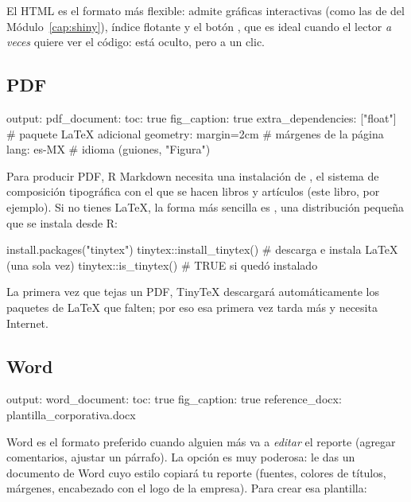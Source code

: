 El HTML es el formato más flexible: admite gráficas interactivas (como las
de  del Módulo~\ref{cap:shiny}), índice flotante y el botón
, que es ideal cuando el lector \emph{a veces} quiere
ver el código: está oculto, pero a un clic.

\subsection{PDF}

\begin{textocodigo}
output:
  pdf_document:
    toc: true
    fig_caption: true
    extra_dependencies: ["float"]   # paquete LaTeX adicional
geometry: margin=2cm                # márgenes de la página
lang: es-MX                         # idioma (guiones, "Figura")
\end{textocodigo}

Para producir PDF, R Markdown necesita una instalación de
, el sistema de composición tipográfica con el que se hacen
libros y artículos (este libro, por ejemplo). Si no tienes LaTeX, la forma
más sencilla es , una distribución pequeña que se instala
desde R:

\begin{rnoejecutar}
install.packages("tinytex")
tinytex::install_tinytex()   # descarga e instala LaTeX (una sola vez)
tinytex::is_tinytex()        # TRUE si quedó instalado
\end{rnoejecutar}

La primera vez que tejas un PDF, TinyTeX descargará automáticamente los
paquetes de LaTeX que falten; por eso esa primera vez tarda más y necesita
Internet.

\subsection{Word}

\begin{textocodigo}
output:
  word_document:
    toc: true
    fig_caption: true
    reference_docx: plantilla_corporativa.docx
\end{textocodigo}

Word es el formato preferido cuando alguien más va a \emph{editar} el
reporte (agregar comentarios, ajustar un párrafo). La opción
 es muy poderosa: le das un documento de Word cuyo
estilo copiará tu reporte (fuentes, colores de títulos, márgenes, encabezado
con el logo de la empresa). Para crear esa plantilla:

